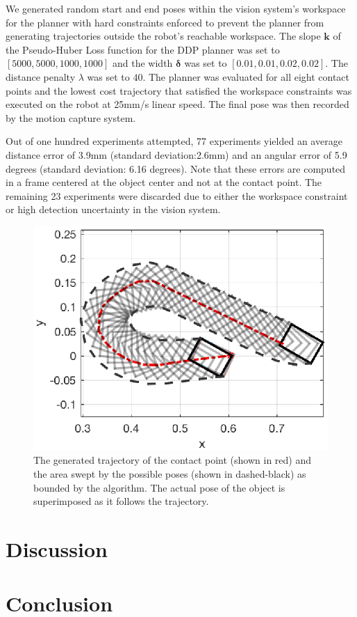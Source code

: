 \documentclass[conference]{IEEEtran}
\begin{document}
We generated random start and end poses within the vision system's
workspace for the planner with hard constraints enforced to prevent
the planner from generating trajectories outside the robot's reachable
workspace.  The slope $\mathbf{k}$ of the Pseudo-Huber Loss function
for the DDP planner was set to $[5000, 5000, 1000, 1000]$ and the
width $\bm{\delta}$ was set to $[0.01, 0.01, 0.02, 0.02]$. The
distance penalty $\lambda$ was set to $40$. The planner was evaluated
for all eight contact points and the lowest cost trajectory that
satisfied the workspace constraints was executed on the robot at
25mm/s linear speed. The final pose was then recorded by the motion
capture system.

Out of one hundred experiments attempted, 77 experiments yielded an
average distance error of 3.9mm (standard deviation:2.6mm) and an
angular error of 5.9 degrees (standard deviation: 6.16 degrees). Note
that these errors are computed in a frame centered at the object
center and not at the contact point.  The remaining 23 experiments
were discarded due to either the workspace constraint or high
detection uncertainty in the vision system.

\begin{figure}
\begin{center}
  \includegraphics[width=\columnwidth]{fig/trajectory_1.eps}
\end{center}
\caption{The generated trajectory of the contact point (shown in red) and the area swept by the possible poses (shown in dashed-black) as bounded by the algorithm. The actual pose of the object is superimposed as it follows the trajectory. } 
\label{fig:trajectory}
\end{figure}






\section{Discussion}\label{sec:discussion}

\section{Conclusion}\label{sec:conclusion}



\end{document}

